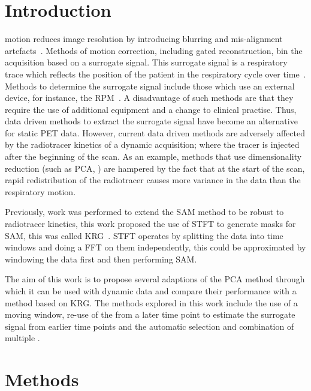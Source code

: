 \section{Introduction} \label{sec:introduction}
     motion reduces image resolution by introducing blurring and mis-alignment artefacts~\cite{Nehmeh2008a}. Methods of motion correction, including gated reconstruction, bin the acquisition based on a surrogate signal. This surrogate signal is a respiratory trace which reflects the position of the patient in the respiratory cycle over time~\cite{Kesner2010AMethods, Kesner2013GatingPET}. Methods to determine the surrogate signal include those which use an external device, for instance, the \gls{RPM}~\cite{Bettinardi2013Motion-trackingPET/CT}. A disadvantage of such methods are that they require the use of additional equipment and a change to clinical practise. Thus, data driven methods to extract the surrogate signal have become an alternative for static PET data.
    However, current data driven methods are adversely affected by the radiotracer kinetics of a dynamic acquisition; where the tracer is injected after the beginning of the scan. As an example, methods that use dimensionality reduction (such as \gls{PCA}, \cite{Thielemans2011, Bertolli2018Data-DrivenTomography}) are hampered by the fact that at the start of the scan, rapid redistribution of the radiotracer causes more variance in the data than the respiratory motion.
    
    Previously, work was performed to extend the \gls{SAM} method to be robust to radiotracer kinetics, this work proposed the use of \gls{STFT} to generate masks for \gls{SAM}, this was called \gls{KRG}~\cite{Schleyer2014}. \gls{STFT} operates by splitting the data into time windows and doing a \gls{FFT} on them independently, this could be approximated by windowing the data first and then performing \gls{SAM}.
    
    The aim of this work is to propose several adaptions of the \gls{PCA} method through which it can be used with dynamic data and compare their performance with a method based on \gls{KRG}. The methods explored in this work include the use of a moving window, re-use of the  from a later time point to estimate the surrogate signal from earlier time points and the automatic selection and combination of multiple .

\vspace{-0.3cm}
    
\section{Methods} \label{sec:methods}
